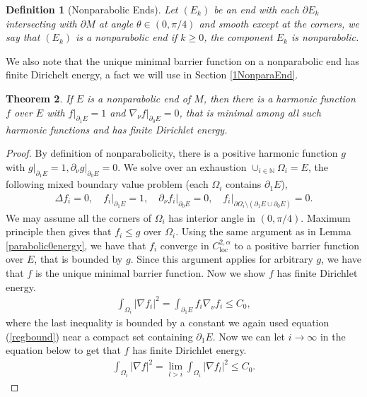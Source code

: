 \documentclass[12pt]{amsart}
\newcommand{\N}{\mathbb N}
\newcommand{\loc}{\text{loc}}
\newcommand{\p}{\partial}
\newtheorem{theorem}{Theorem}[section]
\newtheorem{definition}[theorem]{Definition}
\numberwithin{equation}{section}
\begin{document}
	\begin{definition}[Nonparabolic Ends]
		Let $(E_k)$ be an end with each $\partial E_k$ intersecting with $\partial M$ at angle $\theta \in (0,\pi/4)$ and smooth except at the corners, we say that $(E_k)$ is a nonparabolic end if $k\geq 0$, the component $E_k$ is nonparabolic.
	\end{definition}

	We also note that the unique minimal barrier function on a nonparabolic end has finite Dirichelt energy, a fact we will use in Section \ref{1NonparaEnd}.

	\begin{theorem}\label{finiteDE}
		If $E$ is a nonparabolic end of $M$, then there is a harmonic function $f$ over $E$ with $f \vert_{\partial_1 E}=1$ and $\nabla_{\nu} f\vert_{\partial_0 E}=0$, that is minimal among all such harmonic functions and has finite Dirichlet energy.
	\end{theorem}

	\begin{proof}
		By definition of nonparabolicity, there is a positive harmonic function $g$ with $g\vert_{\partial_1 E}=1, \partial_{\nu} g\vert_{\partial_0 E} =0$. We solve over an exhaustion $\cup_{i\in \N}\Omega_i = E$, the following mixed boundary value problem (each $\Omega_i$ contains $\partial_1 E$),
		\begin{align*}
			\Delta f_i=0, \quad f_i\vert_{\partial_1 E}=1, \quad \partial_{\nu} f_i\vert_{\partial_0 E}=0, \quad f_i\vert_{\partial \Omega_i \setminus (\partial_1E \cup \partial_0 E)}=0.
		\end{align*}
		We may assume all the corners of $\Omega_i$ has interior angle in $(0,\pi/4)$. Maximum principle then gives that $f_i \leq g$ over $\Omega_i$.
		Using the same argument as in Lemma \ref{parabolic0energy}, we have that $f_i$ converge in $C^{2,\alpha}_{\loc}$ to a positive barrier function over $E$, that is bounded by $g$. Since this argument applies for arbitrary $g$, we have that $f$ is the unique minimal barrier function. Now we show $f$ has finite Dirichlet energy.
		\begin{align*}
			\int_{\Omega_i} |\nabla f_i|^2 = \int_{\partial_1 E} f_i\nabla_{\nu} f_i \leq C_0,
		\end{align*}
		where the last inequality is bounded by a constant we again used equation (\ref{regbound}) near a compact set containing $\p_1 E$. Now we can let $i\rightarrow \infty$ in the equation below to get that $f$ has finite Dirichlet energy.
		\begin{align*}
			\int_{\Omega_i} |\nabla f|^2 =\lim_{l>i} \int_{\Omega_i} |\nabla f_l|^2 \leq C_0.
		\end{align*}


	\end{proof}
\end{document}
